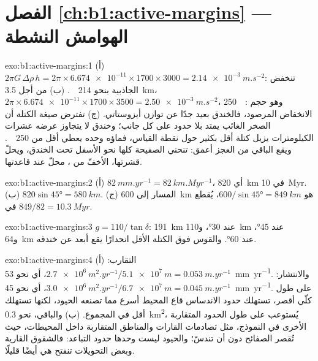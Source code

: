 \section*{الفصل \ref{ch:b1:active-margins} --- الهوامش النشطة}

\begin{solution}{exo:b1:active-margins:1}
(أ) $2\pi G\,\Delta\rho\,h = 2\pi\times\num{6.674e-11}\times1700\times3000 =
\qty{2.14e-3}{m.s^{-2}}$: تنخفض الجاذبية بنحو \qty{214}{\milli\gal}. (ب) من أجل \qty{3.5}{km}،
$2\pi\times\num{6.674e-11}\times1700\times3500 = \qty{2.50e-3}{m.s^{-2}}$،
\qty{250}{\milli\gal}: وهو حجم الانخفاض المرصود، فالخندق بعيد جدًا عن توازن أيزوستاتي. (ج) تفترض صيغة الكتلة أن الصخر الغائب يمتد بلا حدود على كل جانب؛ وخندق لا يتجاوز عرضه عشرات الكيلومترات يزيل كتلة أقل بكثير حول نقطة القياس، فماؤه وحده يعطي أقل من \qty{250}{\milli\gal}. ويقع الباقي من العجز أعمق: تنحني الصفيحة كلها نحو الأسفل تحت الخندق، ويحلّ قشرتها، الأخفّ من ، محلّ  عند قاعدتها.
\end{solution}

\begin{solution}{exo:b1:active-margins:2}
(أ) $\qty{82}{mm.yr^{-1}} = \qty{82}{km.Myr^{-1}}$، أي \qty{820}{km} في \qty{10}{Myr}. (ب) $820\sin\ang{45} = \qty{580}{km}$. (ج) المسار إلى \qty{600}{km} هو $600/\sin\ang{45} = \qty{849}{km}$، يُقطع في $849/82 = \qty{10.3}{Myr}$.
\end{solution}

\begin{solution}{exo:b1:active-margins:3}
$g = 110/\tan\delta$: \qty{191}{km} عند \ang{30}، و\qty{110}{km} عند \ang{45}، و\qty{64}{km} عند \ang{60}. والقوس فوق الكتلة الأقل انحدارًا يقع أبعد عن خندقه.
\end{solution}

\begin{solution}{exo:b1:active-margins:4}
(أ) التقارب: $\qty{2.7e6}{m^2.yr^{-1}}/\qty{5.1e7}{m} =
\qty{0.053}{m.yr^{-1}}$، أي نحو \qty{53}{mm.yr^{-1}}. والانتشار: $\qty{3.0e6}{m^2.yr^{-1}}/\qty{6.7e7}{m} = \qty{0.045}{m.yr^{-1}}$، أي نحو \qty{45}{mm.yr^{-1}}. على طول كلّي أقصر، تستهلك حدود الاندساس قاع المحيط أسرع مما تصنعه الحيود، لكنها تستهلك أقل في المجموع. (ب) والباقي، نحو \qty{0.3}{km^2}، يُستوعب على طول الحدود المتقاربة الأخرى في النموذج، مثل تصادمات القارات والمناطق المتقاربة داخل المحيطات، حيث تُقصر الصفائح دون أن تندسّ؛ والحيود ليست وحدها حدود التباعد: فالشقوق القارية وبعض التحويلات تنفتح هي أيضًا قليلًا.
\end{solution}

